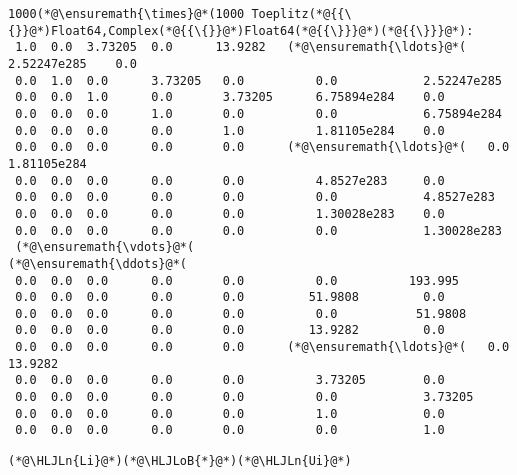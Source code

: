 \documentclass[12pt,landscape]{article}
\newcommand{\HLJLn}[1]{#1}
\newcommand{\HLJLoB}[1]{\textcolor[RGB]{102,102,102}{\textbf{#1}}}
\begin{document}
{\begin{lstlisting}
1000(*@\ensuremath{\times}@*(1000 Toeplitz(*@{{\{}}@*)Float64,Complex(*@{{\{}}@*)Float64(*@{{\}}}@*)(*@{{\}}}@*):
 1.0  0.0  3.73205  0.0      13.9282   (*@\ensuremath{\ldots}@*(   2.52247e285    0.0
 0.0  1.0  0.0      3.73205   0.0          0.0            2.52247e285
 0.0  0.0  1.0      0.0       3.73205      6.75894e284    0.0
 0.0  0.0  0.0      1.0       0.0          0.0            6.75894e284
 0.0  0.0  0.0      0.0       1.0          1.81105e284    0.0
 0.0  0.0  0.0      0.0       0.0      (*@\ensuremath{\ldots}@*(   0.0            1.81105e284
 0.0  0.0  0.0      0.0       0.0          4.8527e283     0.0
 0.0  0.0  0.0      0.0       0.0          0.0            4.8527e283
 0.0  0.0  0.0      0.0       0.0          1.30028e283    0.0
 0.0  0.0  0.0      0.0       0.0          0.0            1.30028e283
 (*@\ensuremath{\vdots}@*(                                     (*@\ensuremath{\ddots}@*(                
 0.0  0.0  0.0      0.0       0.0          0.0          193.995
 0.0  0.0  0.0      0.0       0.0         51.9808         0.0
 0.0  0.0  0.0      0.0       0.0          0.0           51.9808
 0.0  0.0  0.0      0.0       0.0         13.9282         0.0
 0.0  0.0  0.0      0.0       0.0      (*@\ensuremath{\ldots}@*(   0.0           13.9282
 0.0  0.0  0.0      0.0       0.0          3.73205        0.0
 0.0  0.0  0.0      0.0       0.0          0.0            3.73205
 0.0  0.0  0.0      0.0       0.0          1.0            0.0
 0.0  0.0  0.0      0.0       0.0          0.0            1.0
\end{lstlisting}


\begin{lstlisting}
(*@\HLJLn{Li}@*)(*@\HLJLoB{*}@*)(*@\HLJLn{Ui}@*)
\end{lstlisting}

}
\end{document}
